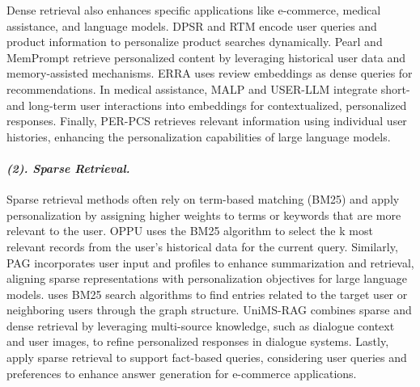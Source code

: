 Dense retrieval also enhances specific applications like e-commerce, medical assistance, and language models. DPSR \cite{zhang2020towards} and RTM \cite{bi2021learning} encode user queries and product information to personalize product searches dynamically. Pearl \cite{mysore2023pearl} and MemPrompt \cite{madaan2022memory} retrieve personalized content by leveraging historical user data and memory-assisted mechanisms. ERRA \cite{cheng2023explainable} uses review embeddings as dense queries for recommendations. In medical assistance, MALP \cite{zhang2023llm} and USER-LLM \cite{ning2024user} integrate short- and long-term user interactions into embeddings for contextualized, personalized responses. Finally, PER-PCS \cite{tan2024personalized} retrieves relevant information using individual user histories, enhancing the personalization capabilities of large language models.  

\paragraph{\textbf{\textit{{(2). Sparse Retrieval.}}}}
Sparse retrieval methods often rely on term-based matching (\eg BM25) and apply personalization by assigning higher weights to terms or keywords that are more relevant to the user.  OPPU \cite{tan2024democratizing} uses the BM25 algorithm to select the k most relevant records from the user's historical data for the current query. Similarly, PAG \cite{richardson2023integrating} incorporates user input and profiles to enhance summarization and retrieval, aligning sparse representations with personalization objectives for large language models. \citet{au2025personalized} uses BM25 search algorithms to find entries related to the target user or neighboring users through the graph structure. UniMS-RAG \cite{wang2024unims} combines sparse and dense retrieval by leveraging multi-source knowledge, such as dialogue context and user images, to refine personalized responses in dialogue systems. Lastly, \citet{deng2022toward} apply sparse retrieval to support fact-based queries, considering user queries and preferences to enhance answer generation for e-commerce applications. 

